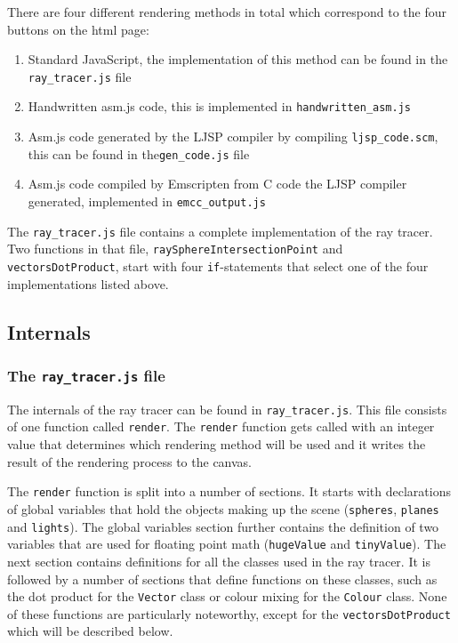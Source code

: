 \documentclass[11pt]{report}
\begin{document}
There are four different rendering methods in total which correspond to the four buttons on the html page:

\begin{enumerate}
\item Standard JavaScript, the implementation of this method can be found in the \texttt{ray_tracer.js} file
\item Handwritten asm.js code, this is implemented in \texttt{handwritten_asm.js}
\item Asm.js code generated by the LJSP compiler by compiling \texttt{ljsp_code.scm}, this can be found in the\texttt{gen_code.js} file
\item Asm.js code compiled by Emscripten from C code the LJSP compiler generated, implemented in \texttt{emcc_output.js}
\end{enumerate}

The \texttt{ray_tracer.js} file contains a complete implementation of the ray tracer. Two functions in that file, \texttt{raySphereIntersectionPoint} and \texttt{vectorsDotProduct}, start with four \texttt{if}-statements that select one of the four implementations listed above. 

\subsection{Internals}
\subsubsection{The \texttt{ray_tracer.js} file}
The internals of the ray tracer can be found in \texttt{ray_tracer.js}. This file consists of one function called \texttt{render}. The \texttt{render} function gets called with an integer value that determines which rendering method will be used and it writes the result of the rendering process to the canvas.

The \texttt{render} function is split into a number of sections. It starts with declarations of global variables that hold the objects making up the scene (\texttt{spheres}, \texttt{planes} and \texttt{lights}). The global variables section further contains the definition of two variables that are used for floating point math (\texttt{hugeValue} and \texttt{tinyValue}). The next section contains definitions for all the classes used in the ray tracer. It is followed by a number of sections that define functions on these classes, such as the dot product for the \texttt{Vector} class or colour mixing for the \texttt{Colour} class. None of these functions are particularly noteworthy, except for the \texttt{vectorsDotProduct} which will be described below.
\end{document}
